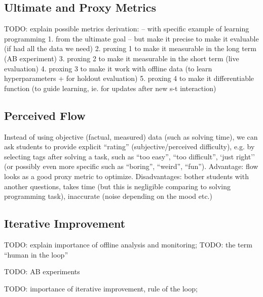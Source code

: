 



\subsection{Ultimate and Proxy Metrics}

TODO: explain possible metrics derivation: -- with specific example of learning programming
1. from the ultimate goal -- but make it precise to make it evaluable (if had all the data we need)
2. proxing 1 to make it measurable in the long term (AB experiment)
3. proxing 2 to make it measurable in the short term (live evaluation)
4. proxing 3 to make it work with offline data (to learn hyperparameters + for holdout evaluation)
5. proxing 4 to make it differentiable function (to guide learning, ie. for updates after new s-t interaction)



\subsection{Perceived Flow}

Instead of using objective (factual, measured) data (such as solving time),
we can ask students to provide explicit ``rating'' (subjective/perceived difficulty),
  e.g. by selecting tags after solving a task,
  such as ``too easy'', ``too difficult'', `just right''
  (or possibly even more specific such as ``boring'', ``weird'', ``fun'').
Advantage: flow looks as a good proxy metric to optimize.
Disadvantages:
  bother students with another questions,
  takes time (but this is negligible comparing to solving programming task),
  inaccurate (noise depending on the mood etc.)



\subsection{Iterative Improvement}
\label{sec:iterative-improvement}


TODO: explain importance of offline analysis and monitoring;
TODO: the term ``human in the loop'' \cite{stupid-tutoring-systems-intelligent-humans}

TODO: AB experiments

TODO: importance of iterative improvement, rule of the loop;
